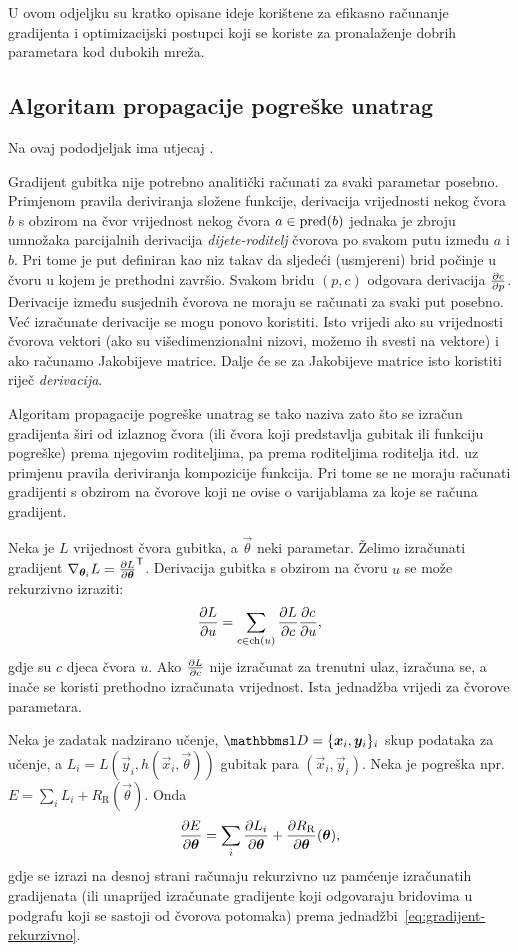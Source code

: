 \documentclass[utf8, diplomski, lmodern]{fer}
\begin{document}
U ovom odjeljku su kratko opisane ideje korištene za efikasno računanje gradijenta i optimizacijski postupci koji se koriste za pronalaženje dobrih parametara kod dubokih mreža.

\subsection{Algoritam propagacije pogreške unatrag}

Na ovaj pododjeljak ima utjecaj \cite{Olah:2015:CCGB}.

Gradijent gubitka nije potrebno analitički računati za svaki parametar posebno. Primjenom pravila deriviranja složene funkcije, derivacija vrijednosti nekog čvora $b$ s obzirom na čvor vrijednost nekog čvora $a\in\mathrm{pred}(b)$ jednaka je zbroju umnožaka parcijalnih derivacija \textit{dijete-roditelj} čvorova po svakom putu između $a$ i $b$. Pri tome je put definiran kao niz takav da sljedeći (usmjereni) brid počinje u čvoru u kojem je prethodni završio. Svakom bridu $(p,c)$ odgovara derivacija $\pd{c}{p}$. Derivacije između susjednih čvorova ne moraju se računati za svaki put posebno. Već izračunate derivacije se mogu ponovo koristiti. Isto vrijedi ako su vrijednosti čvorova vektori (ako su višedimenzionalni nizovi, možemo ih svesti na vektore) i ako računamo Jakobijeve matrice. Dalje će se za Jakobijeve matrice isto koristiti riječ \textit{derivacija}.

Algoritam propagacije pogreške unatrag se tako naziva zato što se izračun gradijenta širi od izlaznog čvora (ili čvora koji predstavlja gubitak ili funkciju pogreške) prema njegovim roditeljima, pa prema roditeljima roditelja itd. uz primjenu pravila deriviranja kompozicije funkcija. Pri tome se ne moraju računati gradijenti s obzirom na čvorove koji ne ovise o varijablama za koje se računa gradijent.

Neka je $L$ vrijednost čvora gubitka, a $\vec\theta$ neki parametar. Želimo izračunati gradijent $\nabla_{\vec\theta_i}L=\pd{L}{\vec\theta}^\tp$. Derivacija gubitka s obzirom na čvoru $u$ se može rekurzivno izraziti: 
\begin{align} \label{eq:gradijent-rekurzivno}
\pd{L}{u} = \sum_{c\in\ch(u)} \pd{L}{c}\pd{c}{u}	\text{,}
\end{align}
gdje su $c$ djeca čvora $u$. Ako $\pd{L}{c}$ nije izračunat za trenutni ulaz, izračuna se, a inače se koristi prethodno izračunata vrijednost. Ista jednadžba vrijedi za čvorove parametara.

Neka je zadatak nadzirano učenje, $\set D=\cbr{\vec x_i, \vec y_i}_i$ skup podataka za učenje, a $L_i=L(\vec y_i, h(\vec x_i,\vec \theta))$ gubitak para $(\vec x_i, \vec y_i)$. Neka je pogreška npr. $E=\sum_i L_i + R_\text{R}(\vec\theta)$. Onda
\begin{align}
\pd{E}{\vec\theta} 
= \sum_{i} \pd{L_i}{\vec\theta} + \pd{R_\text{R}}{\vec\theta}\del{\vec\theta} \text{,}
\end{align}
gdje se izrazi na desnoj strani računaju rekurzivno uz pamćenje izračunatih gradijenata (ili unaprijed izračunate gradijente koji odgovaraju bridovima u podgrafu koji se sastoji od čvorova potomaka) prema jednadžbi~\ref{eq:gradijent-rekurzivno}.
\end{document}
